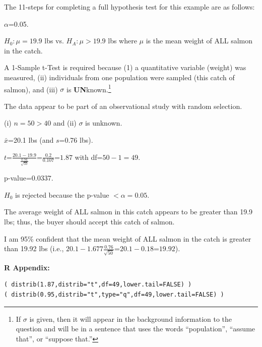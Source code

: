 \documentclass[10pt,openany]{book}\usepackage[]{graphicx}\usepackage[]{color}
\makeatletter
\newenvironment{kframe}{%
 \def\at@end@of@kframe{}%
 \ifinner\ifhmode%
  \def\at@end@of@kframe{\end{minipage}}%
  \begin{minipage}{\columnwidth}%
 \fi\fi%
 \def\FrameCommand##1{\hskip\@totalleftmargin \hskip-\fboxsep
 \colorbox{shadecolor}{##1}\hskip-\fboxsep
     \hskip-\linewidth \hskip-\@totalleftmargin \hskip\columnwidth}%
 \MakeFramed {\advance\hsize-\width
   \@totalleftmargin\z@ \linewidth\hsize
   \@setminipage}}%
 {\par\unskip\endMakeFramed%
 \at@end@of@kframe}
\newenvironment{knitrout}{}{} %
\makeatother
\begin{document}
The 11-steps  for completing a full hypothesis test for this example are as follows:
\vspace{-12pt}
\begin{Enumerate}
    \item $\alpha$=0.05.
    \item $H_{0}:\mu=19.9$ lbs vs. $H_{A}:\mu >19.9$ lbs where $\mu$ is the mean weight of ALL salmon in the catch.
    \item A 1-Sample t-Test is required because (1) a quantitative variable (weight) was measured, (ii) individuals from one population were sampled (this catch of salmon), and (iii) $\sigma$ is \textbf{UN}known.\footnote{If $\sigma$ is given, then it will appear in the background information to the question and will be in a sentence that uses the words ``population'', ``assume that'', or ``suppose that.''}
    \item The data appear to be part of an observational study with random selection.
    \item (i) $n=50>40$ and (ii) $\sigma$ is unknown.
    \item $\bar{x}$=20.1 lbs (and $s$=0.76 lbs).
    \item $t$=$\frac{20.1-19.9}{\frac{0.76}{\sqrt{50}}}$=$\frac{0.2}{0.107}$=$1.87$ with df=$50-1=49$.
    \item p-value=$0.0337$.
    \item $H_{0}$ is rejected because the p-value $< \alpha=0.05$.
    \item The average weight of ALL salmon in this catch appears to be greater than 19.9 lbs; thus, the buyer should accept this catch of salmon.
    \item I am 95\% confident that the mean weight of ALL salmon in the catch is greater than 19.92 lbs (i.e., $20.1-1.677\frac{0.76}{\sqrt{50}}$=$20.1-0.18$=$19.92$).
\end{Enumerate}

\vspace{-6pt}
\begin{minipage}{\textwidth}
\textbf{R Appendix:}
\vspace{-6pt}
\begin{knitrout}
\color{fgcolor}\begin{kframe}
\begin{verbatim}
( distrib(1.87,distrib="t",df=49,lower.tail=FALSE) )
( distrib(0.95,distrib="t",type="q",df=49,lower.tail=FALSE) )
\end{verbatim}
\end{kframe}
\end{knitrout}
\end{minipage}
\end{document}
